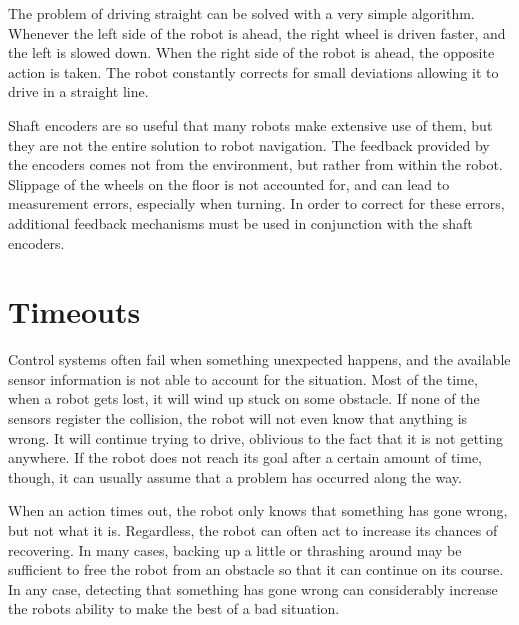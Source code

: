 The problem of driving straight can be solved with a very simple
algorithm. Whenever the left side of the robot is ahead, the right
wheel is driven faster, and the left is slowed down. When the right
side of the robot is ahead, the opposite action is taken. The robot
constantly corrects for small deviations allowing it to drive in a
straight line.

Shaft encoders are so useful that many robots make extensive use of
them, but they are not the entire solution to robot navigation.  The
feedback provided by the encoders comes not from the environment, but
rather from within the robot. Slippage of the wheels on the floor is
not accounted for, and can lead to measurement errors, especially when
turning.  In order to correct for these errors, additional feedback
mechanisms must be used in conjunction with the shaft encoders.

\section{Timeouts}

Control systems often fail when something unexpected happens, and the
available sensor information is not able to account for the situation.
Most of the time, when a robot gets lost, it will wind up stuck on
some obstacle. If none of the sensors register the collision, the
robot will not even know that anything is wrong. It will continue
trying to drive, oblivious to the fact that it is not getting
anywhere. If the robot does not reach its goal after a certain amount
of time, though, it can usually assume that a problem has occurred
along the way.

When an action times out, the robot only knows that something has gone
wrong, but not what it is. Regardless, the robot can often act to
increase its chances of recovering. In many cases, backing up a little
or thrashing around may be sufficient to free the robot from an
obstacle so that it can continue on its course. In any case, detecting
that something has gone wrong can considerably increase the robots
ability to make the best of a bad situation.
